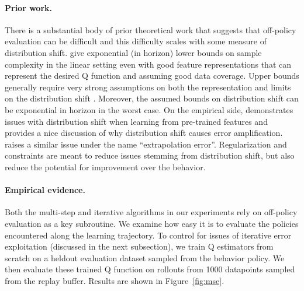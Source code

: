 \paragraph{Prior work.} There is a substantial body of prior theoretical work that suggests that off-policy evaluation can be difficult and this difficulty scales with some measure of distribution shift.
\citet{wang2020statistical, Amortila2020AVO, zanette2021exponential} give exponential (in horizon) lower bounds on sample complexity in the linear setting even with good feature representations that can represent the desired Q function and assuming good data coverage.
Upper bounds generally require very strong assumptions on both the representation and limits on the distribution shift \citep{wang2021instabilities, duan2020minimax, chen2019information}. Moreover, the assumed bounds on distribution shift can be exponential in horizon in the worst case.
On the empirical side, \citet{wang2021instabilities} demonstrates issues with distribution shift when learning from pre-trained features and provides a nice discussion of why distribution shift causes error amplification. \citet{fujimoto2018off} raises a similar issue under the name ``extrapolation error''. Regularization and constraints are meant to reduce issues stemming from distribution shift, but also reduce the potential for improvement over the behavior.


\paragraph{Empirical evidence.} Both the multi-step and iterative algorithms in our experiments rely on off-policy evaluation as a key subroutine. We examine how easy it is to evaluate the policies encountered along the learning trajectory. To control for issues of iterative error exploitation (discussed in the next subsection), we train Q estimators from scratch on a heldout evaluation dataset sampled from the behavior policy. We then evaluate these trained Q function on rollouts from 1000 datapoints sampled from the replay buffer. Results are shown in Figure~\ref{fig:mse}.


